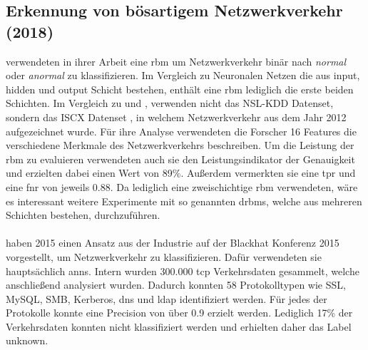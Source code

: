 \documentclass[
    12pt, %
    DIV10,
    ngerman, %
    a4paper, %
    oneside, %
    titlepage, %
    parskip=half, %
    headings=normal, %
    listof=totoc, %
    bibliography=totoc, %
    index=totoc, %
    captions=tableheading, %
    final %
]{scrreprt}
\begin{document}
\subsection{Erkennung von bösartigem Netzwerkverkehr (2018)}\label{iscx1}
\textcite{Aldwairi2018} verwendeten in ihrer Arbeit eine \ac{rbm} um Netzwerkverkehr binär nach \emph{normal} oder \emph{anormal} zu klassifizieren. Im Vergleich zu Neuronalen Netzen die aus input, hidden und output Schicht bestehen, enthält eine \ac{rbm} lediglich die erste beiden Schichten. Im Vergleich zu \textcite{Yin2017} und \textcite{Ding2018}, verwenden \textcite{Aldwairi2018} nicht das NSL-KDD Datenset, sondern das ISCX Datenset \parencite{shiravi2012toward}, in welchem Netzwerkverkehr aus dem Jahr 2012 aufgezeichnet wurde. Für ihre Analyse verwendeten die Forscher 16 Features die verschiedene Merkmale des Netzwerkverkehrs beschreiben.  Um die Leistung der \ac{rbm} zu evaluieren verwendeten auch sie den Leistungsindikator der Genauigkeit und erzielten dabei einen Wert von 89\%. Außerdem vermerkten sie eine \ac{tpr} und eine \ac{fnr} von jeweils 0.88. Da \textcite{Aldwairi2018} lediglich eine zweischichtige \ac{rbm} verwendeten, wäre es interessant weitere Experimente mit so genannten \ac{drbms}, welche aus mehreren Schichten bestehen, durchzuführen.
\\\\
\textcite{Wang2015} haben 2015 einen Ansatz aus der Industrie auf der Blackhat Konferenz 2015 vorgestellt, um Netzwerkverkehr zu klassifizieren. Dafür verwendeten sie hauptsächlich \ac{anns}. Intern wurden 300.000 \ac{tcp} Verkehrsdaten gesammelt, welche anschließend analysiert wurden. Dadurch konnten 58 Protokolltypen wie SSL, MySQL, SMB, Kerberos, \ac{dns} und \ac{ldap} identifiziert werden. Für jedes der Protokolle konnte eine Precision von über 0.9 erzielt werden. Lediglich 17\% der Verkehrsdaten konnten nicht klassifiziert werden und erhielten daher das Label \glqq unknown\grqq.

%
\end{document}
